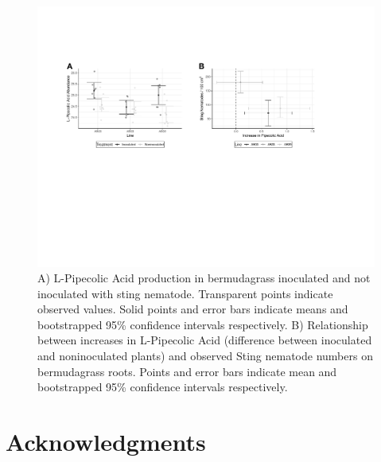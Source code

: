 \documentclass[9pt,lineno]{elife}
\begin{document}
\begin{figure}
\includegraphics[width = 0.95\linewidth]{figures/publication_figures/figure-6.pdf}
\caption{A) L-Pipecolic Acid production in bermudagrass inoculated and not inoculated with sting nematode.  Transparent points indicate observed values.  Solid points and error bars indicate means and bootstrapped 95\% confidence intervals respectively.  B) Relationship between increases in L-Pipecolic Acid (difference between inoculated and noninoculated plants) and observed Sting nematode numbers on bermudagrass roots.  Points and error bars indicate mean and bootstrapped 95\% confidence intervals respectively.   }
\label{fig:figure6}
\end{figure}


\section{Acknowledgments}


\nocite{*} %

\end{document}
